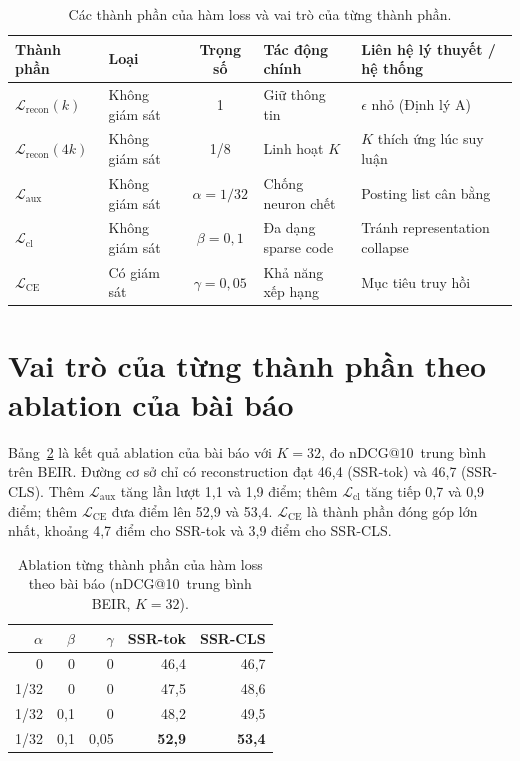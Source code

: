 \documentclass[a4paper,13pt]{extreport}
\makeatletter
\theoremstyle{plain}
\newcommand{\ssr}{SSR}
\newcommand{\ndcg}{nDCG@10}
\makeatother
\begin{document}
\begin{table}[htbp]
\centering
\caption{Các thành phần của hàm loss và vai trò của từng thành phần.}
\label{tab:losses-role}
\small
\begin{tabular}{llcp{3.4cm}p{3.8cm}}
\toprule
\textbf{Thành phần} & \textbf{Loại} & \textbf{Trọng số} & \textbf{Tác động chính} & \textbf{Liên hệ lý thuyết / hệ thống}\\
\midrule
$\mathcal{L}_{\mathrm{recon}}(k)$ & Không giám sát & 1 & Giữ thông tin & $\epsilon$ nhỏ (Định lý A)\\
$\mathcal{L}_{\mathrm{recon}}(4k)$ & Không giám sát & 1/8 & Linh hoạt $K$ & $K$ thích ứng lúc suy luận\\
$\mathcal{L}_{\mathrm{aux}}$ & Không giám sát & $\alpha=1/32$ & Chống neuron chết & Posting list cân bằng\\
$\mathcal{L}_{\mathrm{cl}}$ & Không giám sát & $\beta=0{,}1$ & Đa dạng sparse code & Tránh representation collapse\\
$\mathcal{L}_{\mathrm{CE}}$ & Có giám sát & $\gamma=0{,}05$ & Khả năng xếp hạng & Mục tiêu truy hồi\\
\bottomrule
\end{tabular}
\end{table}

\section{Vai trò của từng thành phần theo ablation của bài báo}
\label{sec:ablation}
Bảng~\ref{tab:ablation} là kết quả ablation của bài báo với $K=32$, đo \ndcg\ trung bình trên BEIR. Đường cơ sở chỉ có reconstruction đạt 46,4 (\ssr-tok) và 46,7 (\ssr-CLS). Thêm $\mathcal{L}_{\mathrm{aux}}$ tăng lần lượt 1,1 và 1,9 điểm; thêm $\mathcal{L}_{\mathrm{cl}}$ tăng tiếp 0,7 và 0,9 điểm; thêm $\mathcal{L}_{\mathrm{CE}}$ đưa điểm lên 52,9 và 53,4. $\mathcal{L}_{\mathrm{CE}}$ là thành phần đóng góp lớn nhất, khoảng 4,7 điểm cho \ssr-tok và 3,9 điểm cho \ssr-CLS.

\begin{table}[htbp]
\centering
\caption{Ablation từng thành phần của hàm loss theo bài báo (\ndcg\ trung bình BEIR, $K=32$).}
\label{tab:ablation}
\small
\begin{tabular}{rrrrr}
\toprule
$\alpha$ & $\beta$ & $\gamma$ & \textbf{\ssr-tok} & \textbf{\ssr-CLS}\\
\midrule
0 & 0 & 0 & 46,4 & 46,7\\
1/32 & 0 & 0 & 47,5 & 48,6\\
1/32 & 0,1 & 0 & 48,2 & 49,5\\
1/32 & 0,1 & 0,05 & \textbf{52,9} & \textbf{53,4}\\
\bottomrule
\end{tabular}
\end{table}
\end{document}
